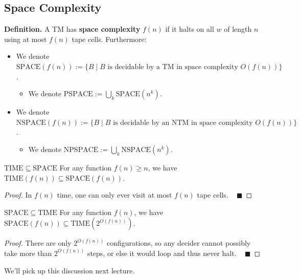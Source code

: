\subsection{Space Complexity}

\textbf{Definition.}
A TM has \textbf{space complexity} $f(n)$
if it halts on all $w$ of length $n$
using at most $f(n)$ tape cells.
Furthermore:
\begin{itemize}
    \item We denote $\mathrm{SPACE}(f(n)) := \{
        B \mid
        B \text{ is decidable by a TM in space complexity } O(f(n))
    \}$.
    \begin{itemize}
        \item We denote $\mathrm{PSPACE} :=
        \bigcup_k \mathrm{SPACE}(n^k)$.
    \end{itemize}
    \item We denote $\mathrm{NSPACE}(f(n)) := \{
        B \mid
        B \text{ is decidable by an NTM in space complexity } O(f(n))
    \}$.
    \begin{itemize}
        \item We denote $\mathrm{NPSPACE} :=
        \bigcup_k \mathrm{NSPACE}(n^k)$.
    \end{itemize}
\end{itemize}

\begin{theorem}{$\mathrm{TIME} \subseteq \mathrm{SPACE}$}
    For any function $f(n) \geq n$, we have
    $\mathrm{TIME}(f(n)) \subseteq \mathrm{SPACE}(f(n))$.
\end{theorem}

\begin{proof}
    In $f(n)$ time, one can only ever visit
    at most $f(n)$ tape cells. ~ $\blacksquare$
\end{proof}

\begin{theorem}{$\mathrm{SPACE} \subseteq \mathrm{TIME}$}
    For any function $f(n)$, we have
    $\mathrm{SPACE}(f(n)) \subseteq \mathrm{TIME}\left(2^{O(f(n))}\right)$.
\end{theorem}

\begin{proof}
    There are only $2^{O(f(n))}$ configurations,
    so any decider
    cannot possibly take more than $2^{O(f(n))}$ steps,
    or else it would loop and thus never halt.
    ~ $\blacksquare$
\end{proof}

We'll pick up this discussion next lecture.

